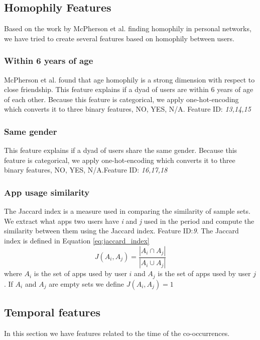\subsection{Homophily Features}
Based on the work by McPherson et al.\cite{mcpherson2001birds} finding homophily in personal networks, we have tried to create several features based on homophily between users.

\subsubsection{Within 6 years of age}
McPherson et al.\cite{mcpherson2001birds} found that age homophily is a strong dimension with respect to close friendship.
This feature explains if a dyad of users are within 6 years of age of each other.
Because this feature is categorical, we apply one-hot-encoding which converts it to three binary features, NO, YES, N/A. Feature ID: \textit{13,14,15}

\subsubsection{Same gender}
This feature explains if a dyad of users share the same gender. 
Because this feature is categorical, we apply one-hot-encoding which converts it to three binary features, NO, YES, N/A.Feature ID: \textit{16,17,18}

\subsubsection{App usage similarity}
The Jaccard index is a measure used in comparing the similarity of sample sets. We extract what apps two users have \textit{i} and \textit{j} used in the period and compute the similarity between them using the Jaccard index. Feature ID:\textit{9}.
The Jaccard index is defined in Equation \ref{eq:jaccard_index}
\begin{equation}
\label{eq:jaccard_index}
J(A_i,A_j) = \frac{ |A_i \cap A_j| }{ |A_i \cup A_j | }
\end{equation}
where $A_i$ is the set of apps used by user $i$ and $A_j$ is the set of apps used by user $j$. If $A_i$ and $A_j$ are empty sets we define $J(A_i, A_j) = 1$

\subsection{Temporal features}
In this section we have features related to the time of the co-occurrences.

